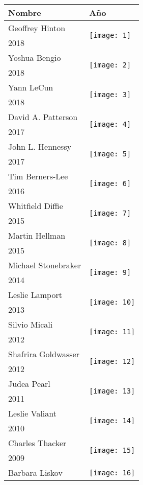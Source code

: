 \documentclass[12pt]{article}
\begin{document}
\begin{center}
\begin{longtable}{| p{} | p{} |} 
\hline
Nombre & Año \\
\hline
Geoffrey Hinton&  \multirow{2}{4em}{\texttt{[image: 1]}} \\ 
2018&   \\ 
Yoshua Bengio &  \multirow{2}{4em}{\texttt{[image: 2]}} \\ 
2018&   \\ 
Yann LeCun &  \multirow{2}{4em}{\texttt{[image: 3]}} \\ 
2018&   \\ 
David A. Patterson &  \multirow{2}{4em}{\texttt{[image: 4]}} \\ 
2017&   \\ 
John L. Hennessy &  \multirow{2}{4em}{\texttt{[image: 5]}} \\ 
2017&   \\ 
Tim Berners-Lee &  \multirow{2}{4em}{\texttt{[image: 6]}} \\ 
2016&   \\ 
Whitfield Diffie &  \multirow{2}{4em}{\texttt{[image: 7]}} \\ 
2015&   \\ 
Martin Hellman &  \multirow{2}{4em}{\texttt{[image: 8]}} \\ 
2015&   \\ 
Michael Stonebraker &  \multirow{2}{4em}{\texttt{[image: 9]}} \\ 
2014&   \\ 
Leslie Lamport &  \multirow{2}{4em}{\texttt{[image: 10]}} \\ 
2013&   \\ 
Silvio Micali &  \multirow{2}{4em}{\texttt{[image: 11]}} \\ 
2012&   \\ 
Shafrira Goldwasser &  \multirow{2}{4em}{\texttt{[image: 12]}} \\ 
2012&   \\ 
Judea Pearl &  \multirow{2}{4em}{\texttt{[image: 13]}} \\ 
2011&   \\ 
Leslie Valiant &  \multirow{2}{4em}{\texttt{[image: 14]}} \\ 
2010&   \\ 
Charles Thacker &  \multirow{2}{4em}{\texttt{[image: 15]}} \\ 
2009&   \\ 
Barbara Liskov &  \multirow{2}{4em}{\texttt{[image: 16]}} \\ 

\end{longtable}
\end{center}
\end{document}
